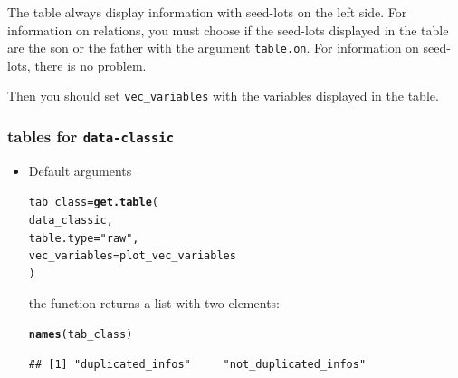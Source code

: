 \documentclass{article}\usepackage[]{graphicx}\usepackage[]{color}
\makeatletter
\newcommand{\hlstr}[1]{\textcolor[rgb]{0.192,0.494,0.8}{#1}}%
\newcommand{\hlopt}[1]{\textcolor[rgb]{0,0,0}{#1}}%
\newcommand{\hlstd}[1]{\textcolor[rgb]{0.345,0.345,0.345}{#1}}%
\newcommand{\hlkwb}[1]{\textcolor[rgb]{0.69,0.353,0.396}{#1}}%
\newcommand{\hlkwc}[1]{\textcolor[rgb]{0.333,0.667,0.333}{#1}}%
\newcommand{\hlkwd}[1]{\textcolor[rgb]{0.737,0.353,0.396}{\textbf{#1}}}%
\newenvironment{kframe}{%
 \def\at@end@of@kframe{}%
 \ifinner\ifhmode%
  \def\at@end@of@kframe{\end{minipage}}%
  \begin{minipage}{\columnwidth}%
 \fi\fi%
 \def\FrameCommand##1{\hskip\@totalleftmargin \hskip-\fboxsep
 \colorbox{shadecolor}{##1}\hskip-\fboxsep
     \hskip-\linewidth \hskip-\@totalleftmargin \hskip\columnwidth}%
 \MakeFramed {\advance\hsize-\width
   \@totalleftmargin\z@ \linewidth\hsize
   \@setminipage}}%
 {\par\unskip\endMakeFramed%
 \at@end@of@kframe}
\newenvironment{knitrout}{}{} %
\makeatother
\begin{document}
The table always display information with seed-lots on the left side.
For information on relations, you must choose if the seed-lots displayed in the table are the son or the father with the argument \texttt{table.on}.
For information on seed-lots, there is no problem.

Then you should set \texttt{vec\_variables} with the variables displayed in the table.

\subsubsection{tables for \texttt{data-classic} }

\begin{itemize}

\item Default arguments

\begin{knitrout}
\color{fgcolor}\begin{kframe}
\begin{alltt}
\hlstd{tab_class} \hlkwb{=} \hlkwd{get.table}\hlstd{(}
        \hlstd{data_classic,}
        \hlkwc{table.type} \hlstd{=} \hlstr{"raw"}\hlstd{,}
        \hlkwc{vec_variables} \hlstd{= plot_vec_variables}
        \hlstd{)}
\end{alltt}
\end{kframe}
\end{knitrout}


the function returns a list with two elements:
\begin{knitrout}
\color{fgcolor}\begin{kframe}
\begin{alltt}
\hlkwd{names}\hlstd{(tab_class)}
\end{alltt}
\begin{verbatim}
## [1] "duplicated_infos"     "not_duplicated_infos"
\end{verbatim}
\end{kframe}
\end{knitrout}

\end{itemize}
\end{document}
